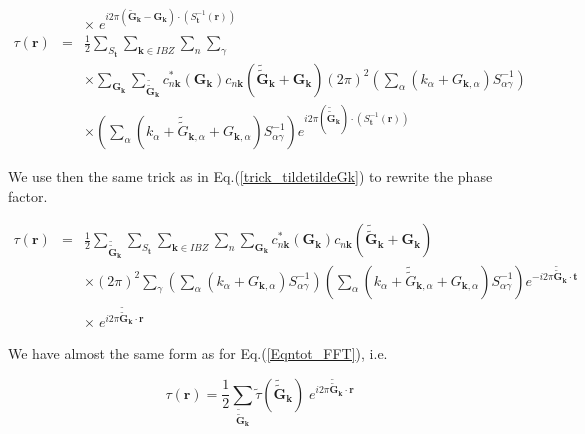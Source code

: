 \documentclass[a4paper,12pt]{report}
\begin{document}
\begin{eqnarray}
&&\times\; e^{i2\pi \left(\tilde{\mathbf{G}}_{\mathbf{k}} -\mathbf{G}_{\mathbf{k}}\right) \cdotp \left( S_{\mathbf{t}}^{-1} (\mathbf{r}) \right)  } \nonumber\\
\tau(\mathbf{r}) &=& \frac{1}{2} \sum_{S_{\mathbf{t}}} \sum_{\mathbf{k} \in IBZ} \sum_n \sum_{\gamma} \nonumber \\
&&\times \sum_{\mathbf{G}_{\mathbf{k}}} \sum_{\tilde{\tilde{\mathbf{G}}}_{\mathbf{k}}} c_{n\mathbf{k}}^{*}(\mathbf{G}_{\mathbf{k}}) c_{n\mathbf{k}}(\tilde{\tilde{\mathbf{G}}}_{\mathbf{k}}+\mathbf{G}_{\mathbf{k}}) (2\pi)^2 \left(\sum_{\alpha}\left( k_{\alpha} + G_{\mathbf{k},\alpha}\right) S_{\alpha\gamma}^{-1} \right) \nonumber \\
&&\times \left(\sum_{\alpha}\left( k_{\alpha} + \tilde{\tilde{G}}_{\mathbf{k},\alpha} + G_{\mathbf{k},\alpha}\right) S_{\alpha\gamma}^{-1} \right) e^{i2\pi \left(\tilde{\tilde{\mathbf{G}}}_{\mathbf{k}}\right) \cdotp \left( S_{\mathbf{t}}^{-1} (\mathbf{r}) \right)  }
\end{eqnarray}

We use then the same trick as in Eq.(\ref{trick_tildetildeGk}) to rewrite the phase factor.

\begin{eqnarray}
\tau(\mathbf{r}) &=& \frac{1}{2} \sum_{\tilde{\tilde{\mathbf{G}}}_{\mathbf{k}}} \sum_{S_{\mathbf{t}}} \sum_{\mathbf{k} \in IBZ} \sum_n \sum_{\mathbf{G}_{\mathbf{k}}} c_{n\mathbf{k}}^{*}(\mathbf{G}_{\mathbf{k}}) c_{n\mathbf{k}}(\tilde{\tilde{\mathbf{G}}}_{\mathbf{k}}+\mathbf{G}_{\mathbf{k}})  \nonumber \\
&&\times  (2\pi)^2 \sum_{\gamma} \left(\sum_{\alpha}\left( k_{\alpha} + G_{\mathbf{k},\alpha}\right) S_{\alpha\gamma}^{-1} \right) \left(\sum_{\alpha}\left( k_{\alpha} + \tilde{\tilde{G}}_{\mathbf{k},\alpha} + G_{\mathbf{k},\alpha}\right) S_{\alpha\gamma}^{-1} \right) e^{-i2\pi \tilde{\tilde{\mathbf{G}}}_{\mathbf{k}} \cdotp \mathbf{t}} \nonumber \\
&&\times\;  e^{i2\pi \tilde{\tilde{\mathbf{G}}}_{\mathbf{k}} \cdotp \mathbf{r}  }
\end{eqnarray}

We have almost the same form as for Eq.(\ref{Eqntot_FFT}), i.e.

\begin{equation}
\tau(\mathbf{r}) = \frac{1}{2} \sum_{\tilde{\tilde{\mathbf{G}}}_{\mathbf{k}}} \tilde{\tau}(\tilde{\tilde{\mathbf{G}}}_{\mathbf{k}})\; e^{i2\pi \tilde{\tilde{\mathbf{G}}}_{\mathbf{k}} \cdotp \mathbf{r} }
\end{equation}
\end{document}
